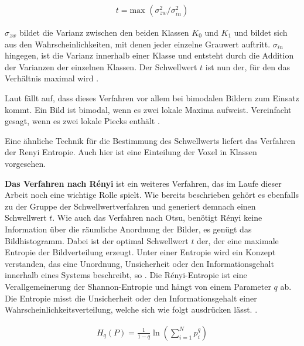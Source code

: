 \begin{align}
	t = \text{max }(\sigma_{zw}^{2}/ \sigma_{in}^{2})
\end{align}

$\sigma_{zw}$ bildet die Varianz zwischen den beiden Klassen $K_{0}$ und $K_{1}$
und bildet sich aus den Wahrscheinlichkeiten, mit denen jeder einzelne Grauwert auftritt.
$\sigma_{in}$ hingegen, ist die Varianz innerhalb einer Klasse und entsteht durch
die Addition der Varianzen der einzelnen Klassen. Der Schwellwert $t$ ist nun
der, für den das Verhältnis maximal wird \citep[vgl.][S.~264]{lehmann2013bildverarbeitung}.

Laut \citet[S.~264]{lehmann2013bildverarbeitung} fällt auf, dass dieses
Verfahren vor allem bei bimodalen Bildern zum Einsatz kommt. Ein Bild ist bimodal,
wenn es zwei lokale Maxima aufweist. Vereinfacht gesagt, wenn es zwei lokale
Piecks enthält \citep[vgl.][S.~264]{lehmann2013bildverarbeitung}.

Eine ähnliche Technik für die Bestimmung des Schwellwerts liefert das Verfahren der
Renyi Entropie. Auch hier ist eine Einteilung der Voxel in Klassen vorgesehen.
\pagebreak

\textbf{Das Verfahren nach Rényi} ist ein weiteres Verfahren, das im Laufe
dieser Arbeit noch eine wichtige Rolle spielt. Wie bereits beschrieben gehört es
ebenfalls zu der Gruppe der Schwellwertverfahren und generiert demnach einen Schwellwert
$t$. Wie auch das Verfahren nach Otsu, benötigt Rényi keine Information über die
räumliche Anordnung der Bilder, es genügt das Bildhistogramm. Dabei ist der optimal
Schwellwert $t$ der, der eine maximale Entropie der Bildverteilung erzeugt. Unter
einer Entropie wird ein Konzept verstanden, das eine Unordnung, Unsicherheit oder
den Informationsgehalt innerhalb eines Systems beschreibt, so \citet[S.~102]{bein2006}.
Die Rényi-Entropie ist eine Verallgemeinerung der Shannon-Entropie und hängt von
einem Parameter $q$ ab. Die Entropie misst die Unsicherheit oder den Informationsgehalt
einer Wahrscheinlichkeitsverteilung, welche sich wie folgt ausdrücken lässt. \citep[vgl.][K.~2]{bromiley2004}.

\begin{align}
	\label{equ:renyi}H_{q}(P) = \frac{1}{1-q}\ln \left( \sum_{i=1}^{N}p_{i}^{q}\right)
\end{align}

